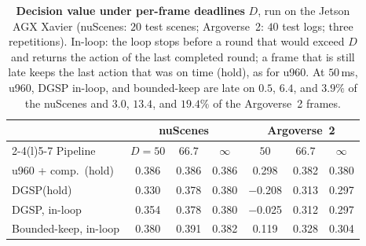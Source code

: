 \documentclass[10pt,letterpaper]{article}
\newcommand{\method}{DGSP\xspace}
\theoremstyle{remark}
\theoremstyle{plain}
\theoremstyle{definition}
\begin{document}
\begin{table}[!tbp]
\centering
\caption{\textbf{Decision value under per-frame deadlines} $D$, run on the Jetson AGX Xavier (nuScenes: $20$ test scenes; Argoverse~2: $40$ test logs; three repetitions). In-loop: the loop stops before a round that would exceed $D$ and returns the action of the last completed round; a frame that is still late keeps the last action that was on time (hold), as for u960. At $50$\,ms, u960, \method in-loop, and bounded-keep are late on $0.5$, $6.4$, and $3.9\%$ of the nuScenes and $3.0$, $13.4$, and $19.4\%$ of the Argoverse~2 frames.}
\label{tab:deadline}
\footnotesize
\setlength{\tabcolsep}{2.2pt}
\begin{tabular}{@{}lcccccc@{}}
\toprule
 & \multicolumn{3}{c}{nuScenes} & \multicolumn{3}{c}{Argoverse~2} \\
\cmidrule(lr){2-4}\cmidrule(l){5-7}
Pipeline & $D{=}50$ & $66.7$ & $\infty$ & $50$ & $66.7$ & $\infty$ \\
\midrule
u960 + comp.\ (hold) & 0.386 & 0.386 & 0.386 & 0.298 & 0.382 & 0.380 \\
\method (hold) & 0.330 & 0.378 & 0.380 & $-$0.208 & 0.313 & 0.297 \\
\method, in-loop & 0.354 & 0.378 & 0.380 & $-$0.025 & 0.312 & 0.297 \\
Bounded-keep, in-loop & 0.380 & 0.391 & 0.382 & 0.119 & 0.328 & 0.304 \\
\bottomrule
\end{tabular}
\end{table}

\clearpage
{
\small


}
\end{document}

